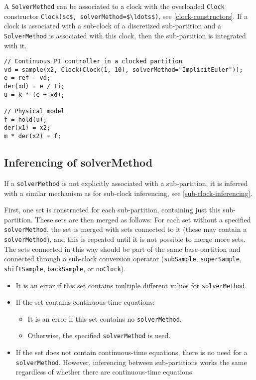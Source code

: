 A \lstinline!SolverMethod! can be associated to a clock with the overloaded \lstinline!Clock! constructor \lstinline!Clock($c$, solverMethod=$\ldots$)!, see \cref{clock-constructors}.
If a clock is associated with a sub-clock of a discretized sub-partition and a \lstinline!SolverMethod! is associated with this clock, then the sub-partition is integrated with it.

\begin{example}
\begin{lstlisting}[language=modelica]
// Continuous PI controller in a clocked partition
vd = sample(x2, Clock(Clock(1, 10), solverMethod="ImplicitEuler"));
e = ref - vd;
der(xd) = e / Ti;
u = k * (e + xd);

// Physical model
f = hold(u);
der(x1) = x2;
m * der(x2) = f;
\end{lstlisting}
\end{example}

\subsection{Inferencing of solverMethod}\label{inferencing-of-solvermethod}

If a \lstinline!solverMethod! is not explicitly associated with a sub-partition, it is inferred with a similar mechanism as for sub-clock inferencing, see \cref{sub-clock-inferencing}.

First, one set is constructed for each sub-partition, containing just this sub-partition.
These sets are then merged as follows:
For each set without a specified \lstinline!solverMethod!, the set is merged with sets connected to it (these may contain a \lstinline!solverMethod!), and this is repeated until it is not possible to merge more sets.
The sets connected in this way should be part of the same base-partition and connected through a sub-clock conversion operator (\lstinline!subSample!, \lstinline!superSample!, \lstinline!shiftSample!, \lstinline!backSample!, or \lstinline!noClock!).

\begin{itemize}
\item It is an error if this set contains multiple different values for \lstinline!solverMethod!.
\item If the set contains continuous-time equations:
\begin{itemize}
\item It is an error if this set contains no \lstinline!solverMethod!.
\item Otherwise, the specified \lstinline!solverMethod! is used.
\end{itemize}
\item If the set does not contain continuous-time equations, there is no need for a \lstinline!solverMethod!.
However, inferencing between sub-partitions works the same regardless of whether there are continuous-time equations.
\end{itemize}

